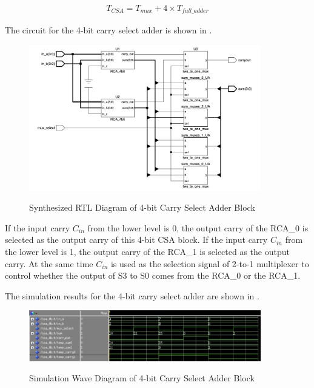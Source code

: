 \begin{equation}
	\begin{array}{c}
		T_{CSA} = T_{mux} + 4 \times T_{full\_adder}
	\end{array}
	\label{exp:csa_delay_exp}
\end{equation}

\noindent The circuit for the 4-bit carry select adder is shown in .

\begin{figure}[!htp]
	\centering
	\caption{Synthesized RTL Diagram of 4-bit Carry Select Adder Block}
	\includegraphics[width=0.9\textwidth]{../img/csa_4_rtl.png}
	\label{fig:csa_4_rtl}
\end{figure}
If the input carry \(C_{in}\) from the lower level is 0, the output carry of the RCA\_0 is selected as the output carry of this 4-bit CSA block.
If the input carry \(C_{in}\) from the lower level is 1, the output carry of the RCA\_1 is selected as the output carry.
At the same time \(C_{in}\) is used as the selection signal of 2-to-1 multiplexer to control whether the output of S3 to S0 comes from the RCA\_0 or the RCA\_1.

\noindent The simulation results for the 4-bit carry select adder are shown in .

\begin{figure}[!htp]
	\centering
	\caption{Simulation Wave Diagram of 4-bit Carry Select Adder Block}
	\includegraphics[width=0.9\textwidth]{../img/csa_4_sim.png}
	\label{fig:csa_4_sim}
\end{figure}

